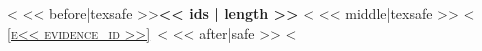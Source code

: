 <%
<< before|texsafe >>\textbf{<< ids | length >>}
<%
<< middle|texsafe >>
<%
\hyperlink{evidence<< evidence_id >>}{{\footnotesize\textsc{[e<< evidence_id >>]}}}\,
<%
<< after|safe >>
<%
